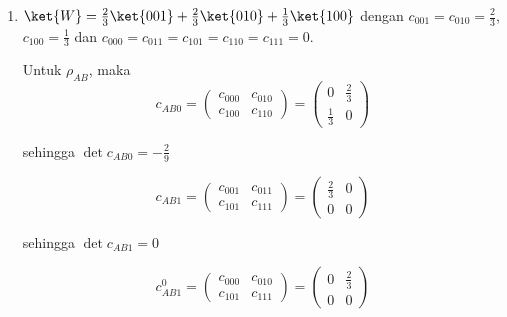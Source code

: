 \begin{enumerate}
	\begin{equation}
		\mathrm{Tr}\,\rho_{AC}\tilde{\rho}_{AC}=4\sin^2\theta \cos^2\theta \cos^2\varphi=4(\frac{8}{9})(\frac{1}{9})(\frac{1}{2})=\frac{16}{81}
	\end{equation}
	
	\begin{equation}
		\mathrm{Tr}\,\rho_{BC}\tilde{\rho}_{BC}=4\sin^4\theta \sin^2\varphi\cos^2\varphi=4(\frac{8}{9})^2(\frac{1}{2})(\frac{1}{2})=\frac{64}{81}
	\end{equation}
	
	\item { $\ket{W}=\frac{2}{3}\ket{001}+\frac{2}{3}\ket{010}+\frac{1}{3}\ket{100}$}
	dengan $c_{001}=c_{010}=\frac{2}{3}$, $c_{100}=\frac{1}{3}$ dan $c_{000}=c_{011}=c_{101}=c_{110}=c_{111}=0$.
	
	Untuk $\rho_{AB}$, maka
	\begin{equation}
		c_{AB0}=
		\begin{pmatrix}
			c_{000} & c_{010} \\
			c_{100} & c_{110}
		\end{pmatrix}=
		\begin{pmatrix}
			0 & \frac{2}{3} \\
			\frac{1}{3} & 0
		\end{pmatrix}
	\end{equation}
	
	sehingga $\det c_{AB0} = -\frac{2}{9}$
	
	\begin{equation}
		c_{AB1}=
		\begin{pmatrix}
			c_{001} & c_{011} \\
			c_{101} & c_{111}
		\end{pmatrix}=
		\begin{pmatrix}
			\frac{2}{3} & 0 \\
			0 & 0
		\end{pmatrix}
	\end{equation}
	
	sehingga $\det c_{AB1} = 0$
	
	\begin{equation}
		c_{AB1}^0=
		\begin{pmatrix}
			c_{000} & c_{010} \\
			c_{101} & c_{111}
		\end{pmatrix}=
		\begin{pmatrix}
			0 & \frac{2}{3} \\
			0 & 0
		\end{pmatrix}
	\end{equation}
	

\end{enumerate}
